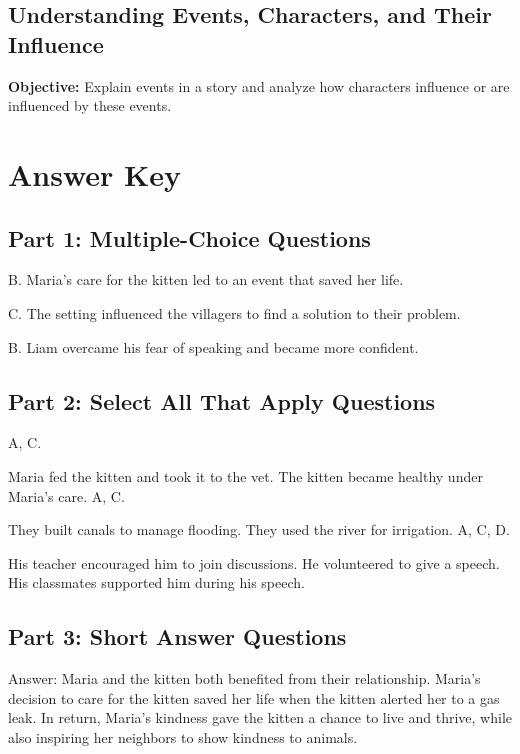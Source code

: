 \documentclass[12pt]{article}
\begin{document}
\subsection*{Understanding Events, Characters, and Their Influence}
\onehalfspacing

\begin{tcolorbox}[colframe=black!40, colback=gray!0, title=Learning Objective]
\textbf{Objective:} Explain events in a story and analyze how characters influence or are influenced by these events.
\end{tcolorbox}

\section*{Answer Key}

\subsection*{Part 1: Multiple-Choice Questions}

B. Maria’s care for the kitten led to an event that saved her life.

C. The setting influenced the villagers to find a solution to their problem.

B. Liam overcame his fear of speaking and became more confident.

\subsection*{Part 2: Select All That Apply Questions}

A, C.

Maria fed the kitten and took it to the vet.
The kitten became healthy under Maria’s care.
A, C.

They built canals to manage flooding.
They used the river for irrigation.
A, C, D.

His teacher encouraged him to join discussions.
He volunteered to give a speech.
His classmates supported him during his speech.
\subsection*{Part 3: Short Answer Questions}

Answer: Maria and the kitten both benefited from their relationship. Maria’s decision to care for the kitten saved her life when the kitten alerted her to a gas leak. In return, Maria’s kindness gave the kitten a chance to live and thrive, while also inspiring her neighbors to show kindness to animals.
\end{document}
